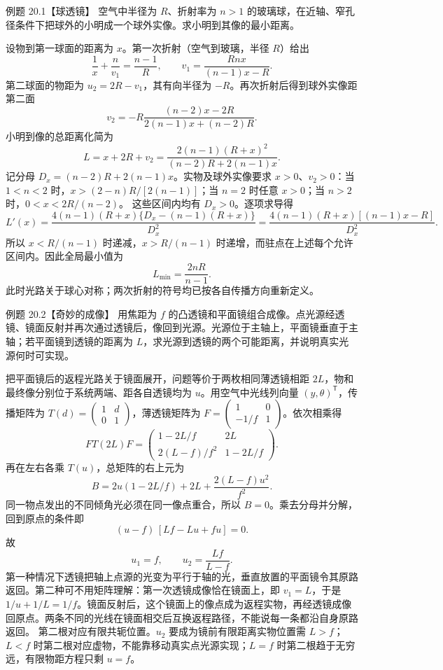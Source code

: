 \begin{origexamplebox}{例题 20.1【球透镜】}
空气中半径为 $R$、折射率为 $n>1$ 的玻璃球，在近轴、窄孔径条件下把球外的小明成一个球外实像。求小明到其像的最小距离。
\end{origexamplebox}
\begin{xesolution}
设物到第一球面的距离为 $x$。第一次折射（空气到玻璃，半径 $R$）给出
\[
 \frac1x+\frac n{v_1}=\frac{n-1}{R},\qquad
 v_1=\frac{Rn x}{(n-1)x-R}.
\]
第二球面的物距为 $u_2=2R-v_1$，其有向半径为 $-R$。再次折射后得到球外实像距第二面
\[
 v_2=-R\frac{(n-2)x-2R}{2(n-1)x+(n-2)R}.
\]
小明到像的总距离化简为
\[
 L=x+2R+v_2
 =\frac{2(n-1)(R+x)^2}{(n-2)R+2(n-1)x}.
\]
记分母 $D_x=(n-2)R+2(n-1)x$。实物及球外实像要求 $x>0$、$v_2>0$：当 $1<n<2$ 时，$x>(2-n)R/[2(n-1)]$；当 $n=2$ 时任意 $x>0$；当 $n>2$ 时，$0<x<2R/(n-2)$。
这些区间内均有 $D_x>0$。逐项求导得
\[
 L'(x)=\frac{4(n-1)(R+x)\{D_x-(n-1)(R+x)\}}{D_x^2}
 =\frac{4(n-1)(R+x)[(n-1)x-R]}{D_x^2}.
\]
所以 $x<R/(n-1)$ 时递减，$x>R/(n-1)$ 时递增，而驻点在上述每个允许区间内。因此全局最小值为
\[
 \boxed{L_{\min}=\frac{2nR}{n-1}}.
\]
此时光路关于球心对称；两次折射的符号均已按各自传播方向重新定义。
\end{xesolution}

\begin{origexamplebox}{例题 20.2【奇妙的成像】}
用焦距为 $f$ 的凸透镜和平面镜组合成像。点光源经透镜、镜面反射并再次通过透镜后，像回到光源。光源位于主轴上，平面镜垂直于主轴；若平面镜到透镜的距离为 $L$，求光源到透镜的两个可能距离，并说明真实光源何时可实现。
\end{origexamplebox}
\begin{xesolution}
把平面镜后的返程光路关于镜面展开，问题等价于两枚相同薄透镜相距 $2L$，物和最终像分别位于系统两端、距各自透镜均为 $u$。用空气中光线列向量 $(y,\theta)^{\mathsf T}$，传播矩阵为 $T(d)=\left(\begin{smallmatrix}1&d\\0&1\end{smallmatrix}\right)$，薄透镜矩阵为 $F=\left(\begin{smallmatrix}1&0\\-1/f&1\end{smallmatrix}\right)$。依次相乘得
\[
 FT(2L)F=\begin{pmatrix}1-2L/f&2L\\2(L-f)/f^2&1-2L/f\end{pmatrix}.
\]
再在左右各乘 $T(u)$，总矩阵的右上元为
\[
 B=2u(1-2L/f)+2L+\frac{2(L-f)u^2}{f^2}.
\]
同一物点发出的不同倾角光必须在同一像点重合，所以 $B=0$。乘去分母并分解，回到原点的条件即
\[
 (u-f)\,[Lf-Lu+fu]=0.
\]
故
\[
 \boxed{u_1=f,\qquad u_2=\frac{Lf}{L-f}}.
\]
第一种情况下透镜把轴上点源的光变为平行于轴的光，垂直放置的平面镜令其原路返回。第二种可不用矩阵理解：第一次透镜成像恰在镜面上，即 $v_1=L$，于是 $1/u+1/L=1/f$。镜面反射后，这个镜面上的像点成为返程实物，再经透镜成像回原点。两条不同的光线在镜面相交后互换返程路径，不能说每一条都沿自身原路返回。
\SelfConjugateDiagram
第二根对应有限共轭位置。$u_2$ 要成为镜前有限距离实物位置需 $L>f$；$L<f$ 时第二根对应虚物，不能靠移动真实点光源实现；$L=f$ 时第二根趋于无穷远，有限物距方程只剩 $u=f$。
\end{xesolution}

